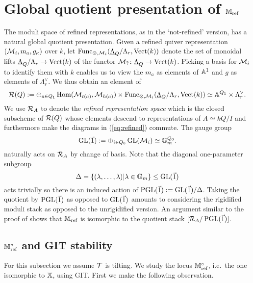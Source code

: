 \documentclass[12pt]{amsart}
\begin{document}
\section{Global quotient presentation of $\mathbb{M}_\textup{ref}$}\label{sc:GIT}

The moduli space of refined representations, as in the `not-refined' version, has a natural global quotient presentation.
Given a refined quiver representation $(\mathcal{M}_i, m_a, g_\kappa)$ over $k$, let $\text{Func}_{\otimes, \mathcal{M}_i}(\underline{\Lambda}_{Q}/\Lambda_r, \operatorname{Vect}(k))$ denote the set of monoidal lifts $\underline{\Lambda}_{Q}/\Lambda_r\rightarrow \operatorname{Vect}(k)$ of the functor $\mathcal{M}_? \colon \underline{\Lambda}_{Q} \rightarrow \operatorname{Vect}(k)$.
Picking a basis for $\mathcal{M}_i$ to identify them with $k$ enables us to view the $m_a$ as elements of $\mathbb{A}^1$ and $g$ as elements of $\Lambda_r^{\vee}$. We thus obtain an element of
\begin{equation*}
\mathcal{R}(Q) := \oplus_{a \in Q_1} \operatorname{Hom}(\mathcal{M}_{t(a)}, \mathcal{M}_{h(a)}) \times \text{Func}_{\otimes, \mathcal{M}_i}(\underline{\Lambda}_{Q}/\Lambda_r, \operatorname{Vect}(k))\simeq \mathbb{A}^{Q_1} \times \Lambda_r^{\vee}. \end{equation*}
We use $\mathcal{R}_A$ to denote the {\em refined representation space} which is the closed subscheme of $\mathcal{R}(Q)$ whose elements descend to representations of $A \simeq kQ/I$ and furthermore make the diagrams in (\ref{eq:refined}) commute.
The gauge group
\begin{equation*}
\operatorname{GL}(\vec{1}) := \oplus_{i \in Q_0} \operatorname{GL}(\mathcal{M}_i) \simeq \mathbb{G}_m^{Q_0}.
\end{equation*}
naturally acts on $\mathcal{R}_A$ by change of basis.
Note that the diagonal one-parameter subgroup 
$$\Delta = \{(\lambda, \ldots,\lambda) | \lambda \in \mathbb{G}_m\} \leq \operatorname{GL}(\vec{1})$$ 
acts trivially so there is an induced action of $\operatorname{PGL}(\vec{1}) := \operatorname{GL}(\vec{1}) / \Delta$.
Taking the quotient by $\operatorname{PGL}(\vec{1})$ as opposed to $\operatorname{GL}(\vec{1})$ amounts to considering the rigidified moduli stack as opposed to the unrigidified version. 
An argument similar to the proof of \cite[Proposition 3.9]{Abd} shows that $\mathbb{M}_{\text{ref}}$ is isomorphic to the quotient stack $[\mathcal{R}_A/ \operatorname{PGL}(\vec{1})]$.

\subsection{$\mathbb{M}_{\text{ref}}^\circ$ and GIT stability}

For this subsection we assume $\mathcal{T}$ is tilting.
We study the locus $\mathbb{M}_{\text{ref}}^\circ$, i.e.\ the one isomorphic to $\mathbb{X}$, using GIT. First we make the following observation.
\end{document}
